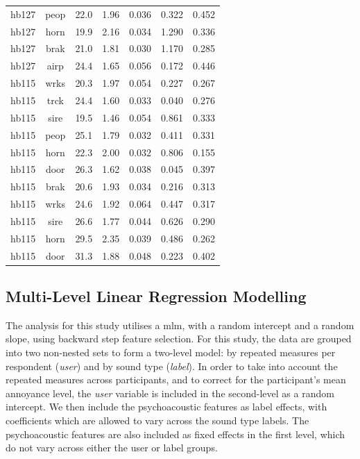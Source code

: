 \begin{table}
{\begin{tabular}{ccccccc}
hb127 & peop & 22.0 & 1.96 & 0.036 & 0.322 & 0.452 \\
hb127 & horn & 19.9 & 2.16 & 0.034 & 1.290 & 0.336 \\
hb127 & brak & 21.0 & 1.81 & 0.030 & 1.170 & 0.285 \\
hb127 & airp & 24.4 & 1.65 & 0.056 & 0.172 & 0.446 \\ 
\hline
hb115 & wrks & 20.3 & 1.97 & 0.054 & 0.227 & 0.267 \\
hb115 & trck & 24.4 & 1.60 & 0.033 & 0.040 & 0.276 \\
hb115 & sire & 19.5 & 1.46 & 0.054 & 0.861 & 0.333 \\
hb115 & peop & 25.1 & 1.79 & 0.032 & 0.411 & 0.331 \\
hb115 & horn & 22.3 & 2.00 & 0.032 & 0.806 & 0.155 \\
hb115 & door & 26.3 & 1.62 & 0.038 & 0.045 & 0.397 \\
hb115 & brak & 20.6 & 1.93 & 0.034 & 0.216 & 0.313 \\ 
\hline
hb115 & wrks & 24.6 & 1.92 & 0.064 & 0.447 & 0.317 \\
hb115 & sire & 26.6 & 1.77 & 0.044 & 0.626 & 0.290 \\
hb115 & horn & 29.5 & 2.35 & 0.039 & 0.486 & 0.262 \\
hb115 & door & 31.3 & 1.88 & 0.048 & 0.223 & 0.402 \\
\bottomrule
\end{tabular}
}
\end{table}

\subsection{Multi-Level Linear Regression Modelling}

The analysis for this study utilises a \gls{mlm}, with a random intercept and a random slope, using backward step feature selection. For this study, the data are grouped into two non-nested sets to form a two-level model: by repeated measures per respondent (\emph{user}) and by sound type (\emph{label}). In order to take into account the repeated measures across participants, and to correct for the participant's mean annoyance level, the \emph{user} variable is included in the second-level as a random intercept. We then include the psychoacoustic features as label effects, with coefficients which are allowed to vary across the sound type labels. The psychoacoustic features are also included as fixed effects in the first level, which do not vary across either the user or label groups.

